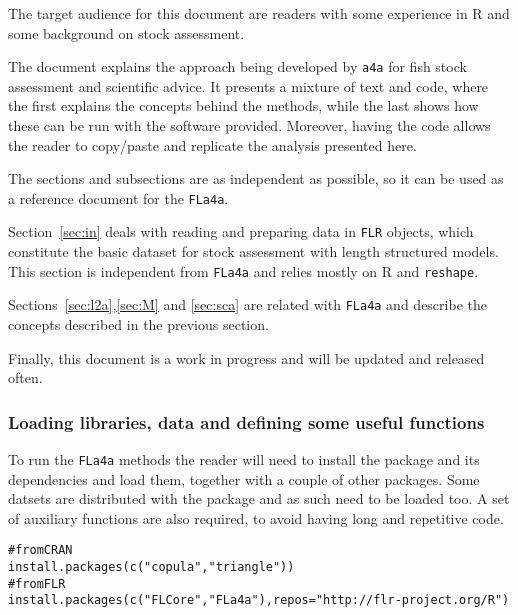 \documentclass[a4paper,english,10pt]{article}\usepackage[]{graphicx}\usepackage[]{color}
\makeatletter
\newcommand{\hlstr}[1]{\textcolor[rgb]{0.2,0.2,0.2}{#1}}%
\newcommand{\hlcom}[1]{\textcolor[rgb]{0.2,0.267,0.4}{#1}}%
\newcommand{\hlstd}[1]{\textcolor[rgb]{0,0,0}{#1}}%
\newcommand{\hlkwc}[1]{\textcolor[rgb]{0.361,0.506,0.596}{#1}}%
\newcommand{\hlkwd}[1]{\textcolor[rgb]{0.361,0.506,0.596}{#1}}%
\newenvironment{kframe}{%
 \def\at@end@of@kframe{}%
 \ifinner\ifhmode%
  \def\at@end@of@kframe{\end{minipage}}%
  \begin{minipage}{\columnwidth}%
 \fi\fi%
 \def\FrameCommand##1{\hskip\@totalleftmargin \hskip-\fboxsep
 \colorbox{shadecolor}{##1}\hskip-\fboxsep
     \hskip-\linewidth \hskip-\@totalleftmargin \hskip\columnwidth}%
 \MakeFramed {\advance\hsize-\width
   \@totalleftmargin\z@ \linewidth\hsize
   \@setminipage}}%
 {\par\unskip\endMakeFramed%
 \at@end@of@kframe}
\newenvironment{knitrout}{}{} %
\newcommand{\initiative}[1]{{\texttt{#1}}}
\newcommand{\pkg}[1]{{\texttt{#1}}}
\newcommand{\R}{{\normalfont\textsf{R }}{}}
\makeatother
\begin{document}
The target audience for this document are readers with some experience in R and some background on stock assessment.

The document explains the approach being developed by \initiative{a4a} for fish stock assessment and scientific advice. It presents a mixture of text and code, where the first explains the concepts behind the methods, while the last shows how these can be run with the software provided. Moreover, having the code allows the reader to copy/paste and replicate the analysis presented here.

The sections and subsections are as independent as possible, so it can be used as a reference document for the \pkg{FLa4a}. 

Section~\ref{sec:in} deals with reading and preparing data in \pkg{FLR} objects, which constitute the basic dataset for stock assessment with length structured models. This section is independent from \pkg{FLa4a} and relies mostly on \R and \pkg{reshape}.

Sections~\ref{sec:l2a},\ref{sec:M} and \ref{sec:sca} are related with \pkg{FLa4a} and describe the concepts described in the previous section.

Finally, this document is a work in progress and will be updated and released often.

\subsubsection{Loading libraries, data and defining some useful functions}

To run the \pkg{FLa4a} methods the reader will need to install the package and its dependencies and load them, together with a couple of other packages. Some datsets are distributed with the package and as such need to be loaded too. A set of auxiliary functions are also required, to avoid having long and repetitive code.

\begin{knitrout}
\color{fgcolor}\begin{kframe}
\begin{alltt}
\hlcom{# from CRAN}
\hlkwd{install.packages}\hlstd{(}\hlkwd{c}\hlstd{(}\hlstr{"copula"}\hlstd{,}\hlstr{"triangle"}\hlstd{))}
\hlcom{# from FLR}
\hlkwd{install.packages}\hlstd{(}\hlkwd{c}\hlstd{(}\hlstr{"FLCore"}\hlstd{,} \hlstr{"FLa4a"}\hlstd{),} \hlkwc{repos}\hlstd{=}\hlstr{"http://flr-project.org/R"}\hlstd{)}
\end{alltt}
\end{kframe}
\end{knitrout}
\end{document}
